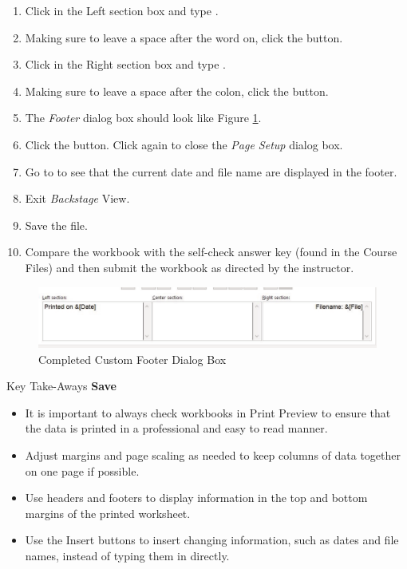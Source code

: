 \begin{enumerate}
	\item Click in the Left section box and type .
	\item Making sure to leave a space after the word on, click the  button.
	\item Click in the Right section box and type .
	\item Making sure to leave a space after the colon, click the  button.
	\item The \textit{Footer} dialog box should look like Figure \ref{02:fig46}.
	\item Click the  button. Click  again to close the \textit{Page Setup} dialog box.
	\item Go to  to see that the current date and file name are displayed in the footer.
	\item Exit \textit{Backstage} View. 
	\item Save the  file.
	\item Compare the workbook with the self-check answer key (found in the Course Files) and then submit the  workbook as directed by the instructor.
\end{enumerate}

\begin{figure}[H]
	\centering
	\includegraphics[width=\maxwidth{.95\linewidth}]{gfx/ch02_fig46}
	\caption{Completed Custom Footer Dialog Box}
	\label{02:fig46}
\end{figure}

\begin{center}
	\begin{tkwbox}{Key Take-Aways}
		\textbf{Save}
		\\
		\begin{itemize}
			\setlength{\itemsep}{0pt}
			\setlength{\parskip}{0pt}
			\setlength{\parsep}{0pt}
			
			\item It is important to always check workbooks in Print Preview to ensure that the data is printed in a professional and easy to read manner.
			\item Adjust margins and page scaling as needed to keep columns of data together on one page if possible.
			\item Use headers and footers to display information in the top and bottom margins of the printed worksheet.
			\item Use the Insert buttons to insert changing information, such as dates and file names, instead of typing them in directly.
			
		\end{itemize}
	\end{tkwbox}
\end{center}

